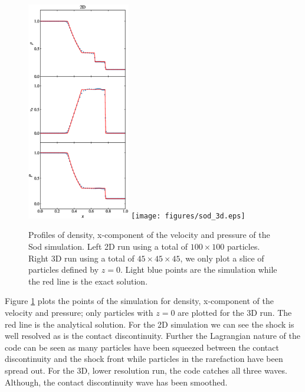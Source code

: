 \begin{figure}
    \begin{center}
        \includegraphics[width=0.4\textwidth]{figures/sod_2d.eps}
        \texttt{[image: figures/sod\_3d.eps]}
        \caption{Profiles of density, x-component of the velocity and pressure of the Sod simulation. Left 2D run using 
        a total of $100\times100$ particles. Right 3D run using a total of $45\times45\times45$,
        we only plot a slice of particles defined by $z=0$.
        Light blue points are the simulation while the red line is the exact solution.}
        \label{fig.sod}
    \end{center}
\end{figure}
Figure \ref{fig.sod} plots the points of the simulation for density, x-component of
the velocity and pressure; only particles with $z=0$ are plotted for the 3D run. The red line is the analytical solution. For the 2D simulation we can see
the shock is well resolved as is the contact discontinuity. Further the Lagrangian nature of
the code can be seen as many particles have been squeezed between the contact discontinuity and the
shock front while particles in the rarefaction have been spread out. For the 3D, lower resolution
run, the code catches all three waves. Although, the contact discontinuity wave has been
smoothed.

